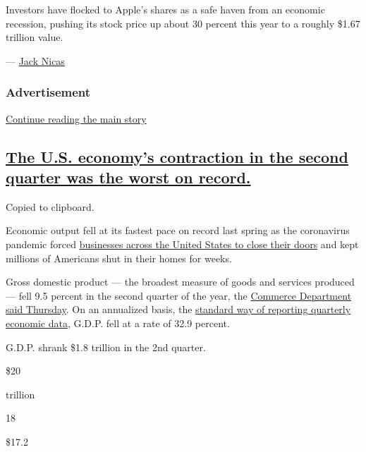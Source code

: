 Investors have flocked to Apple's shares as a safe haven from an
economic recession, pushing its stock price up about 30 percent this
year to a roughly \$1.67 trillion value.

--- \href{https://www.nytimes3xbfgragh.onion/by/jack-nicas}{Jack Nicas}

\hypertarget{advertisement-1}{%
\subsubsection{Advertisement}\label{advertisement-1}}

\protect\hyperlink{after-dfp-ad-mid2}{Continue reading the main story}

\hypertarget{the-us-economys-contraction-in-the-second-quarter-was-the-worst-on-record}{%
\subsection{\texorpdfstring{\protect\hyperlink{the-us-economys-contraction-in-the-second-quarter-was-the-worst-on-record}{The
U.S. economy's contraction in the second quarter was the worst on
record.}}{The U.S. economy's contraction in the second quarter was the worst on record.}}\label{the-us-economys-contraction-in-the-second-quarter-was-the-worst-on-record}}

Copied to clipboard.

Economic output fell at its fastest pace on record last spring as the
coronavirus pandemic forced
\href{https://www.nytimes3xbfgragh.onion/2020/07/17/business/economy/how-to-save-economy.html?action=click\&module=RelatedLinks\&pgtype=Article}{businesses
across the United States to close their doors} and kept millions of
Americans shut in their homes for weeks.

Gross domestic product --- the broadest measure of goods and services
produced --- fell 9.5 percent in the second quarter of the year, the
\href{https://www.bea.gov/sites/default/files/2020-07/gdp2q20_adv.pdf}{Commerce
Department said Thursday}. On an annualized basis, the
\href{https://www.nytimes3xbfgragh.onion/2020/07/29/business/economy/us-gdp-report.html}{standard
way of reporting quarterly economic data}, G.D.P. fell at a rate of 32.9
percent.

G.D.P. shrank \$1.8 trillion in the 2nd quarter.

\$20

trillion

18

\$17.2


